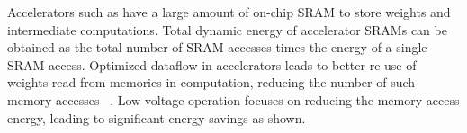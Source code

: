 Accelerators such as \cite{ChenISCA2016,ChenASPLOS2014,ChandramoorthyHPCA2019, ReagenISCA2016, nvdla, DuISCA2015,SharmaISCA2018} have a large amount of on-chip SRAM to store weights and intermediate computations. Total dynamic energy of accelerator SRAMs can be obtained as the total number of SRAM accesses times the energy of a single SRAM access. Optimized dataflow in accelerators leads to better re-use of weights read from memories in computation, reducing the number of such memory accesses ~\cite{ChenISCA2016,ChenASPLOS2014, nvdla}. Low voltage operation focuses on reducing the memory access energy, leading to significant energy savings as shown. 